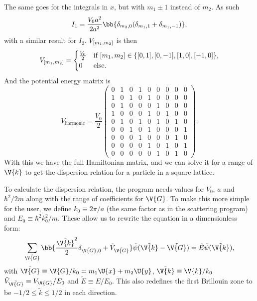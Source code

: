 \documentclass[main.tex]{subfiles}
\begin{document}
	The same goes for the integrals in $ x $, but with $ m_1 \pm 1 $ instead of $ m_2 $. As such
	\begin{equation}
		I_1 = \frac{V_0 a^2}{2 a^2} \bb{\delta_{m_2,0} (\delta_{m_1, 1} + \delta_{m_1, -1})},
	\end{equation}
	with a similar result for $ I_2 $. $ V_{[m_1, m_2]} $ is then
	\begin{equation}
		V_{[m_1, m_2]} = \begin{cases}
			\frac{V_0}{2} 	& \text{if } [m_1, m_2] \in \{[0,1], [0,-1], [1,0], [-1,0]\}, \\
			0					& \text{else}.
		\end{cases}
	\end{equation}
	And the potential energy matrix is
	\begin{equation}
		V_{\text{harmonic}} = \frac{V_0}{2} \begin{pmatrix}
		0 & 1 & 0 & 1 & 0 & 0 & 0 & 0 & 0 \\
		1 & 0 & 1 & 0 & 1 & 0 & 0 & 0 & 0 \\
		0 & 1 & 0 & 0 & 0 & 1 & 0 & 0 & 0 \\
		1 & 0 & 0 & 0 & 1 & 0 & 1 & 0 & 0 \\
		0 & 1 & 0 & 1 & 0 & 1 & 0 & 1 & 0 \\
		0 & 0 & 1 & 0 & 1 & 0 & 0 & 0 & 1 \\
		0 & 0 & 0 & 1 & 0 & 0 & 0 & 1 & 0 \\
		0 & 0 & 0 & 0 & 1 & 0 & 1 & 0 & 1 \\
		0 & 0 & 0 & 0 & 0 & 1 & 0 & 1 & 0
		\end{pmatrix}.
	\end{equation}
	With this we have the full Hamiltonian matrix, and we can solve it for a range of $ \V{k} $ to get the dispersion relation for a particle in a square lattice.
	
	To calculate the dispersion relation, the program needs values for $ V_0 $, $ a $ and $ \hbar^2/2m $ along with the range of coefficients for $ \V{G} $. To make this more simple for the user, we define $ k_0 \equiv 2\pi/a $ (the same factor as in the scattering program) and $ E_0 \equiv \hbar^2 k_0^2/m $. These allow us to rewrite the equation in a dimensionless form:
	\begin{equation}\label{key}
		\sum_{\tilde{\V{G}}} \bb{\frac{\tilde{\V{k}}^2}{2} \delta_{\tilde{\V{G}},0} + \tilde{V}_{\tilde{\V{G}}}} \tilde{\psi}(\tilde{\V{k}} - \tilde{\V{G}}) = \tilde{E} \tilde{\psi}(\tilde{\V{k}}),
	\end{equation}
	with $ \tilde{\V{G}} \equiv \V{G}/k_0 = m_1 \U{x}+m_2 \U{y} $, $ \tilde{\V{k}} \equiv \V{k}/k_0 $ $ \tilde{V}_{\tilde{\V{G}}} \equiv V_{\V{G}} / E_0$ and $ \tilde{E} \equiv E/E_0 $. This also redefines the first Brillouin zone to be $ -1/2 \leq \tilde{k} \leq 1/2 $ in each direction.
	
\end{document}
